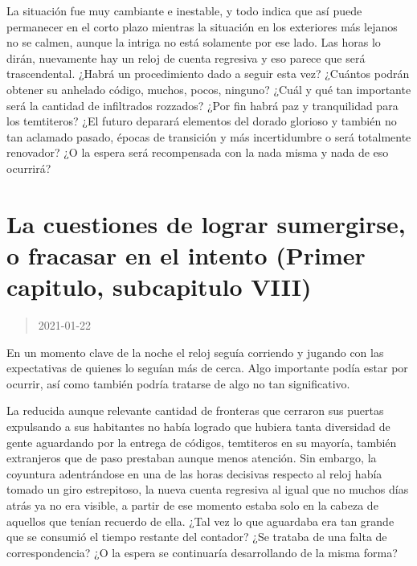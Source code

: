 \documentclass[
  spanish,
]{book}
\begin{document}
La situación fue muy cambiante e inestable, y todo indica que así puede permanecer en el corto plazo mientras la situación en los exteriores más lejanos no se calmen, aunque la intriga no está solamente por ese lado. Las horas lo dirán, nuevamente hay un reloj de cuenta regresiva y eso parece que será trascendental. ¿Habrá un procedimiento dado a seguir esta vez? ¿Cuántos podrán obtener su anhelado código, muchos, pocos, ninguno? ¿Cuál y qué tan importante será la cantidad de infiltrados rozzados? ¿Por fin habrá paz y tranquilidad para los temtiteros? ¿El futuro deparará elementos del dorado glorioso y también no tan aclamado pasado, épocas de transición y más incertidumbre o será totalmente renovador? ¿O la espera será recompensada con la nada misma y nada de eso ocurrirá?

\hypertarget{la-cuestiones-de-lograr-sumergirse-o-fracasar-en-el-intento-primer-capitulo-subcapitulo-viii}{%
\section{La cuestiones de lograr sumergirse, o fracasar en el intento (Primer capitulo, subcapitulo VIII)}\label{la-cuestiones-de-lograr-sumergirse-o-fracasar-en-el-intento-primer-capitulo-subcapitulo-viii}}

\begin{quote}
2021-01-22
\end{quote}

En un momento clave de la noche el reloj seguía corriendo y jugando con las expectativas de quienes lo seguían más de cerca. Algo importante podía estar por ocurrir, así como también podría tratarse de algo no tan significativo.

La reducida aunque relevante cantidad de fronteras que cerraron sus puertas expulsando a sus habitantes no había logrado que hubiera tanta diversidad de gente aguardando por la entrega de códigos, temtiteros en su mayoría, también extranjeros que de paso prestaban aunque menos atención. Sin embargo, la coyuntura adentrándose en una de las horas decisivas respecto al reloj había tomado un giro estrepitoso, la nueva cuenta regresiva al igual que no muchos días atrás ya no era visible, a partir de ese momento estaba solo en la cabeza de aquellos que tenían recuerdo de ella. ¿Tal vez lo que aguardaba era tan grande que se consumió el tiempo restante del contador? ¿Se trataba de una falta de correspondencia? ¿O la espera se continuaría desarrollando de la misma forma?
\end{document}

